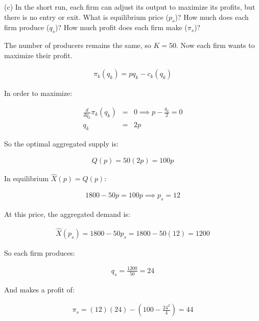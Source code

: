\begin{tcolorbox}
    (c) In the short run, each firm can adjust its output to maximize its profits, but there is no entry or exit. What is equilibrium price (\( p_s \))? How much does each firm produce (\( q_s \))? How much profit does each firm make (\( \pi_s \))?
\end{tcolorbox}

The number of producers remains the same, so \( K = 50 \). Now each firm wants to maximize their profit.

\begin{eqnarray*}
\pi_k(q_k) = pq_k - c_k(q_k)
\end{eqnarray*}

In order to maximize:

\begin{eqnarray*}
\frac{d}{dq_k} \pi_k(q_k) &=& 0 \implies p - \frac{q_k}{2} = 0\\
q_k &=& 2p
\end{eqnarray*}

So the optimal aggregated supply is:

\begin{eqnarray*}
Q(p) = 50(2p) = 100p
\end{eqnarray*}

In equilibrium \( \hat{X}(p) = Q(p) \):

\begin{eqnarray*}
1800 - 50p = 100p  \implies p_s = 12
\end{eqnarray*}

At this price, the aggregated demand is:

\begin{eqnarray*}
\hat{X}(p_s) = 1800 - 50p_s = 1800 - 50(12) = 1200
\end{eqnarray*}

So each firm produces:

\begin{eqnarray*}
q_s = \frac{1200}{50} = 24
\end{eqnarray*}

And makes a profit of:

\begin{eqnarray*}
\pi_s = (12)(24) - \left(100 - \frac{24^2}{4}\right) = 44
\end{eqnarray*}

